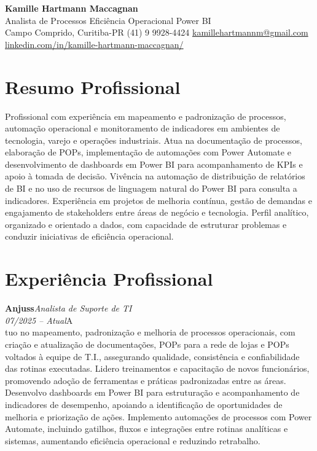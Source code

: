 \documentclass[11pt,a4paper]{article}
\newcommand{\cvrole}[4]{%
  \vspace{4pt}%
  {\bfseries\color{accentcolor}#1}\hfill{\itshape #2}\\[-2pt]%
  {\itshape #3}\hfill #4\\[6pt]%
}
\begin{document}
\begin{center}
  {\fontsize{20}{24}\selectfont\bfseries Kamille Hartmann Maccagnan}\\[8pt]
  {\large Analista de Processos \textbar{} Eficiência Operacional \textbar{} Power BI}\\[10pt]
  Campo Comprido, Curitiba-PR \enspace\textbullet\enspace (41) 9 9928-4424 \enspace\textbullet\enspace
  \href{mailto:kamillehartmannm@gmail.com}{kamillehartmannm@gmail.com}\\[3pt]
  \href{https://linkedin.com/in/kamille-hartmann-maccagnan/}{linkedin.com/in/kamille-hartmann-maccagnan/}
\end{center}

\vspace{6pt}

\section{Resumo Profissional}

Profissional com experiência em mapeamento e padronização de processos, automação operacional e monitoramento de indicadores em ambientes de tecnologia, varejo e operações industriais. Atua na documentação de processos, elaboração de POPs, implementação de automações com Power Automate e desenvolvimento de dashboards em Power BI para acompanhamento de KPIs e apoio à tomada de decisão. Vivência na automação de distribuição de relatórios de BI e no uso de recursos de linguagem natural do Power BI para consulta a indicadores. Experiência em projetos de melhoria contínua, gestão de demandas e engajamento de stakeholders entre áreas de negócio e tecnologia. Perfil analítico, organizado e orientado a dados, com capacidade de estruturar problemas e conduzir iniciativas de eficiência operacional.

\section{Experiência Profissional}

\cvrole{Anjuss}{Analista de Suporte de TI}{07/2025 -- Atual}

Atuo no mapeamento, padronização e melhoria de processos operacionais, com criação e atualização de documentações, POPs para a rede de lojas e POPs voltados à equipe de T.I., assegurando qualidade, consistência e confiabilidade das rotinas executadas. Lidero treinamentos e capacitação de novos funcionários, promovendo adoção de ferramentas e práticas padronizadas entre as áreas. Desenvolvo dashboards em Power BI para estruturação e acompanhamento de indicadores de desempenho, apoiando a identificação de oportunidades de melhoria e priorização de ações. Implemento automações de processos com Power Automate, incluindo gatilhos, fluxos e integrações entre rotinas analíticas e sistemas, aumentando eficiência operacional e reduzindo retrabalho.
\end{document}
